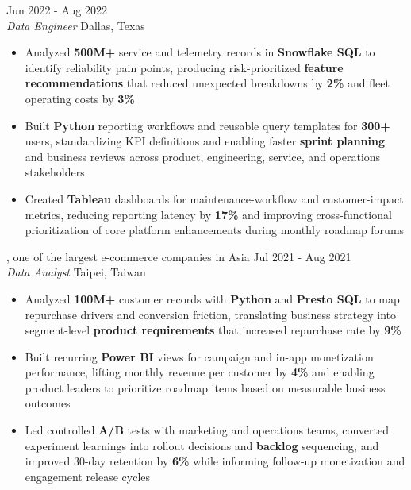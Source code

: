 \documentclass[11pt,letterpaper]{article}
\begin{document}
\vspace{4pt}
 \hfill Jun 2022 - Aug 2022\\[-1pt]
\textit{Data Engineer} \hfill Dallas, Texas
\begin{itemize}[leftmargin=1.5em, rightmargin=0pt, itemsep=-1pt, topsep=-1pt, parsep=0pt]
  \item \justifying Analyzed \textbf{500M+} service and telemetry records in \textbf{Snowflake SQL} to identify reliability pain points, producing risk-prioritized \textbf{feature recommendations} that reduced unexpected breakdowns by \textbf{2\%} and fleet operating costs by \textbf{3\%}
  \item \justifying Built \textbf{Python} reporting workflows and reusable query templates for \textbf{300+} users, standardizing KPI definitions and enabling faster \textbf{sprint planning} and business reviews across product, engineering, service, and operations stakeholders
  \item \justifying Created \textbf{Tableau} dashboards for maintenance-workflow and customer-impact metrics, reducing reporting latency by \textbf{17\%} and improving cross-functional prioritization of core platform enhancements during monthly roadmap forums
\end{itemize}

\vspace{4pt}
, one of the largest e-commerce companies in Asia \hfill Jul 2021 - Aug 2021\\[-1pt]
\textit{Data Analyst} \hfill Taipei, Taiwan
\begin{itemize}[leftmargin=1.5em, rightmargin=0pt, itemsep=-1pt, topsep=-1pt, parsep=0pt]
  \item \justifying Analyzed \textbf{100M+} customer records with \textbf{Python} and \textbf{Presto SQL} to map repurchase drivers and conversion friction, translating business strategy into segment-level \textbf{product requirements} that increased repurchase rate by \textbf{9\%}
  \item \justifying Built recurring \textbf{Power BI} views for campaign and in-app monetization performance, lifting monthly revenue per customer by \textbf{4\%} and enabling product leaders to prioritize roadmap items based on measurable business outcomes
  \item \justifying Led controlled \textbf{A/B} tests with marketing and operations teams, converted experiment learnings into rollout decisions and \textbf{backlog} sequencing, and improved 30-day retention by \textbf{6\%} while informing follow-up monetization and engagement release cycles
\end{itemize}
\end{document}
